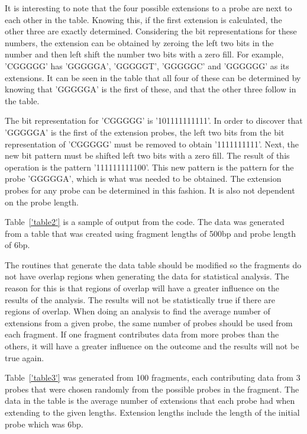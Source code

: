 It is interesting to note that the four possible extensions to a probe are
next to each other in the table.  Knowing this, if the first extension is
calculated, the other three are exactly determined.  Considering the bit
representations for these numbers, the extension can be obtained by zeroing
the left two bits in the number and then left shift the number two bits
with a zero fill.  For example, 'CGGGGG' has 'GGGGGA', 'GGGGGT', 'GGGGGC'
and 'GGGGGG' as its extensions.  It can be seen in the table that all four
of these can be determined by knowing that 'GGGGGA' is the first of these,
and that the other three follow in the table.

The bit representation for 'CGGGGG' is '101111111111'.  In order to
discover that 'GGGGGA' is the first of the extension probes, the left two
bits from the bit representation of 'CGGGGG' must be removed to obtain
'1111111111'.  Next, the new bit pattern must be shifted left two bits with
a zero fill.  The result of this operation is the pattern '111111111100'.
This new pattern is the pattern for the probe 'GGGGGA', which is what was
needed to be obtained.  The extension probes for any probe can be
determined in this fashion.  It is also not dependent on the probe length.

Table~\ref{'table2'} is a sample of output from the code.  The data was generated from a
table that was created using fragment lengths of 500bp and probe length of
6bp.



The routines that generate the data table should be modified so the
fragments do not have overlap regions when generating the data for
statistical analysis.  The reason for this is that regions of overlap will
have a greater influence on the results of the analysis.  The results will
not be statistically true if there are regions of overlap.  When doing an
analysis to find the average number of extensions from a given probe, the
same number of probes should be used from each fragment.  If one fragment
contributes data from more probes than the others, it will have a greater
influence on the outcome and the results will not be true again.

Table~\ref{'table3'} was generated from 100 fragments, each contributing
data from 3 probes that were chosen randomly from the possible probes in
the fragment.  The data in the table is the average number of extensions
that each probe had when extending to the given lengths.  Extension lengths
include the length of the initial probe which was 6bp.

